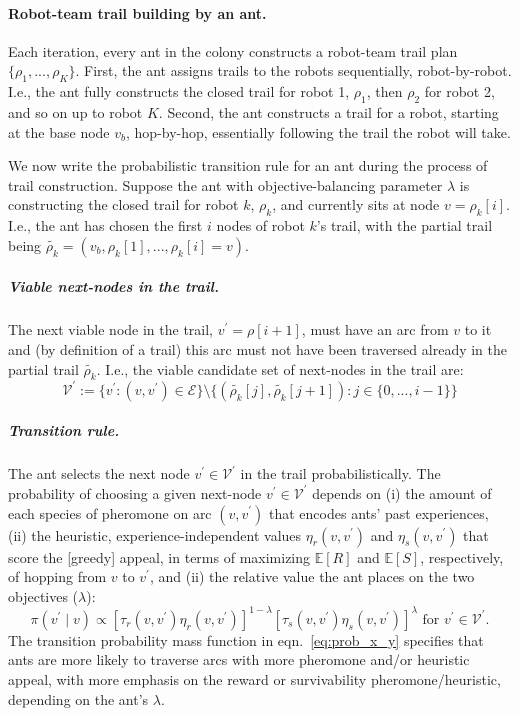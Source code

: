 \documentclass[11pt, oneside]{article}
\begin{document}
 
\paragraph{Robot-team trail building by an ant.}
Each iteration, every ant in the colony constructs a robot-team trail plan $\{\rho_1, ..., \rho_K\}$.
First, the ant assigns trails to the robots sequentially, robot-by-robot. 
I.e., the ant fully constructs the closed trail for robot 1, $\rho_1$, then $\rho_2$ for robot 2, and so on up to robot $K$.
Second, the ant constructs a trail for a robot, starting at the base node $v_b$, hop-by-hop, essentially following the trail the robot will take. 

We now write the probabilistic transition rule for an ant during the process of trail construction.
Suppose the ant with objective-balancing parameter $\lambda$ is constructing the closed trail for robot $k$, $\rho_k$, and currently sits at node $v=\rho_k[i]$.
I.e., the ant has chosen the first $i$ nodes of robot $k$'s trail, with the partial trail being $\tilde{\rho_k}=(v_b, \rho_k[1], ..., \rho_k[i]=v)$. 
\subparagraph{Viable next-nodes in the trail.}
The next viable node in the trail, $v^\prime = \rho[i+1]$, must have an arc from $v$ to it and (by definition of a trail) this arc must not have been traversed already in the partial trail $\tilde{\rho_k}$. I.e., the viable candidate set of next-nodes in the trail are:
\begin{equation}
 	\mathcal{V}^\prime := \{ v^\prime : (v, v^\prime ) \in \mathcal{E} \} \setminus \{ (\tilde{\rho_k}[j], \tilde{\rho_k}[j+1]) : j \in \{0,...,i-1\} \}
\end{equation}

\subparagraph{Transition rule.}
The ant selects the next node $v^\prime \in  \mathcal{V}^\prime$ in the trail probabilistically. The probability of choosing a given next-node $v^\prime \in  \mathcal{V}^\prime$ depends on (i) the amount of each species of pheromone on arc $(v, v^\prime)$ that encodes ants' past experiences, (ii) the heuristic, experience-independent values $\eta_r(v, v^\prime)$ and $\eta_s(v, v^\prime)$ that score the [greedy] appeal, in terms of maximizing $\mathbb{E}[R]$ and $\mathbb{E}[S]$, respectively, of hopping from $v$ to $v^\prime$, and (ii) the relative value the ant places on the two objectives ($\lambda$):
\begin{equation}
	\pi(v^\prime \mid v) \propto 
		 \left[\tau_r(v, v^\prime) \eta_r(v, v^\prime) \right]^{1-\lambda} \left[ \tau_s(v, v^\prime) \eta_s(v, v^\prime) \right]^\lambda \text{ for }  v^\prime \in \mathcal{V}^\prime.
	 \label{eq:prob_x_y}
\end{equation}
The transition probability mass function in eqn.~\ref{eq:prob_x_y} specifies that ants are more likely to traverse arcs with more pheromone and/or heuristic appeal, with more emphasis on the reward or survivability pheromone/heuristic, depending on the ant's $\lambda$.
\end{document}
